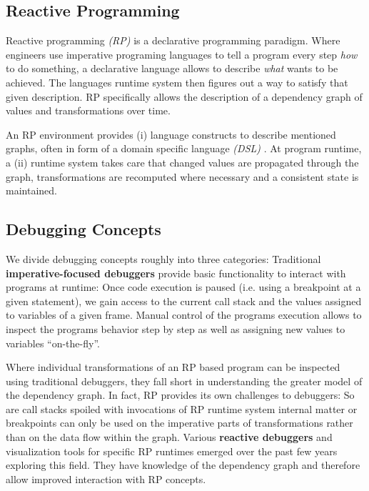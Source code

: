 \documentclass[12pt,a4paper]{article}
\begin{document}
\subsection{Reactive Programming}

Reactive programming \emph{(RP)} is a declarative programming paradigm. Where engineers use imperative programing languages to tell a program every step \emph{how} to do something, a declarative language allows to describe \emph{what} wants to be achieved. The languages runtime system then figures out a way to satisfy that given description. RP specifically allows the description of a dependency graph of values and transformations over time.

An RP environment provides (i) language constructs to describe mentioned graphs, often in form of a domain specific language \emph{(DSL)} \cite{10.1145/2577080.2577083}. At program runtime, a (ii) runtime system takes care that changed values are propagated through the graph, transformations are recomputed where necessary and a consistent state is maintained.

\subsection{Debugging Concepts}

We divide debugging concepts roughly into three categories: Traditional \textbf{imperative-focused debuggers} provide basic functionality to interact with programs at runtime: Once code execution is paused (i.e. using a breakpoint at a given statement), we gain access to the current call stack and the values assigned to variables of a given frame. Manual control of the programs execution allows to inspect the programs behavior step by step as well as assigning new values to variables ``on-the-fly''.

Where individual transformations of an RP based program can be inspected using traditional debuggers, they fall short in understanding the greater model of the dependency graph. In fact, RP provides its own challenges to debuggers: So are call stacks spoiled with invocations of RP runtime system internal matter or breakpoints can only be used on the imperative parts of transformations rather than on the data flow within the graph. Various \textbf{reactive debuggers} and visualization tools for specific RP runtimes emerged over the past few years \cite{10.1145/2884781.2884815} \cite{rxviz} \cite{10.1145/3180155.3180156} exploring this field. They have knowledge of the dependency graph and therefore allow improved interaction with RP concepts.
\end{document}
